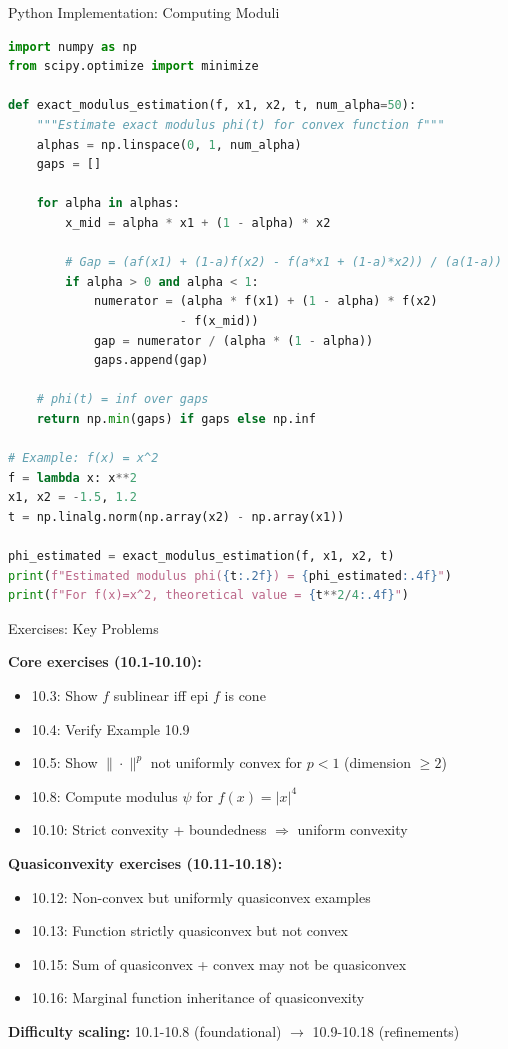 \documentclass[aspectratio=169,10pt]{beamer}
\begin{document}
\begin{frame}[fragile]{Python Implementation: Computing Moduli}

\begin{lstlisting}[language=Python, basicstyle=\ttfamily\small]
import numpy as np
from scipy.optimize import minimize

def exact_modulus_estimation(f, x1, x2, t, num_alpha=50):
    """Estimate exact modulus phi(t) for convex function f"""
    alphas = np.linspace(0, 1, num_alpha)
    gaps = []
    
    for alpha in alphas:
        x_mid = alpha * x1 + (1 - alpha) * x2
        
        # Gap = (af(x1) + (1-a)f(x2) - f(a*x1 + (1-a)*x2)) / (a(1-a))
        if alpha > 0 and alpha < 1:
            numerator = (alpha * f(x1) + (1 - alpha) * f(x2) 
                        - f(x_mid))
            gap = numerator / (alpha * (1 - alpha))
            gaps.append(gap)
    
    # phi(t) = inf over gaps
    return np.min(gaps) if gaps else np.inf

# Example: f(x) = x^2
f = lambda x: x**2
x1, x2 = -1.5, 1.2
t = np.linalg.norm(np.array(x2) - np.array(x1))

phi_estimated = exact_modulus_estimation(f, x1, x2, t)
print(f"Estimated modulus phi({t:.2f}) = {phi_estimated:.4f}")
print(f"For f(x)=x^2, theoretical value = {t**2/4:.4f}")
\end{lstlisting}
\end{frame}

\begin{frame}{Exercises: Key Problems}

\textbf{Core exercises (10.1-10.10):}
\begin{itemize}
\item 10.3: Show $f$ sublinear iff epi $f$ is cone
\item 10.4: Verify Example 10.9
\item 10.5: Show $\|\cdot\|^p$ not uniformly convex for $p < 1$ (dimension $\geq 2$)
\item 10.8: Compute modulus $\psi$ for $f(x) = |x|^4$
\item 10.10: Strict convexity + boundedness $\Rightarrow$ uniform convexity
\end{itemize}

\textbf{Quasiconvexity exercises (10.11-10.18):}
\begin{itemize}
\item 10.12: Non-convex but uniformly quasiconvex examples
\item 10.13: Function strictly quasiconvex but not convex
\item 10.15: Sum of quasiconvex + convex may not be quasiconvex
\item 10.16: Marginal function inheritance of quasiconvexity
\end{itemize}

\textbf{Difficulty scaling:} 10.1-10.8 (foundational) $\to$ 10.9-10.18 (refinements)
\end{frame}
\end{document}
